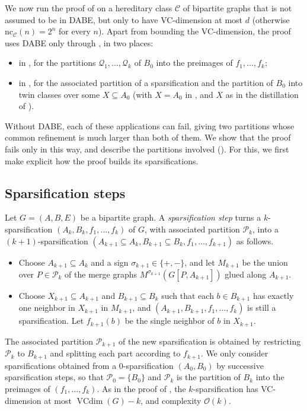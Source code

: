 \documentclass[11pt]{article}
\theoremstyle{definition}
\newcommand{\CC}{{\mathscr C}}
\newcommand{\Oh}{\mathcal{O}}
\newcommand{\nc}{\text{nc}}
\newcommand{\set}[1]{\{#1\}}
\DeclareMathOperator{\VCdim}{VCdim}
\newcommand{\Pp}{\mathcal{P}}
\newcommand{\Qq}{\mathcal{Q}}
\newcommand{\remph}[1]{{\color{red} \emph{#1}}}
\begin{document}
We now run the proof of  on a hereditary class $\CC$ of bipartite graphs that is not assumed to be in DABE, but only to have VC-dimension at most $d$ (otherwise $\nc_\CC(n) = 2^n$ for every $n$).
Apart from bounding the VC-dimension, the proof uses DABE only through , in two places:
\begin{itemize}
  \item in , for the partitions $\Qq_1, \dots, \Qq_k$ of $B_0$ into the preimages of $f_1, \dots, f_k$;
  \item in , for the associated partition of a sparsification and the partition of $B_0$ into twin classes over some $X \subseteq A_0$ (with $X = A_0$ in , and $X$ as in the distillation of ).
\end{itemize}
Without DABE, each of these applications can fail, giving two partitions whose common refinement is much larger than both of them.
We show that the proof fails only in this way, and describe the partitions involved ().
For this, we first make explicit how the proof builds its sparsifications.

\subsection{Sparsification steps}
Let $G = (A, B, E)$ be a bipartite graph.
A \remph{sparsification step} turns a $k$-sparsification $(A_k, B_k, f_1, \dots, f_k)$ of $G$, with associated partition $\Pp_{k}$, into a $(k+1)$-sparsification $(A_{k+1} \subseteq A_k,B_{k+1} \subseteq B_k, f_1, \dots, f_{k+1})$ as follows.
\begin{itemize}
  \item Choose $A_{k+1} \subseteq A_k$ and a sign $\sigma_{k+1} \in \set{+, -}$, and let $M_{k+1}$ be the union over $P \in \Pp_k$ of the merge graphs $M^{\sigma_{k+1}}(G[P, A_{k+1}])$ glued along $A_{k+1}$.
  \item Choose $X_{k+1} \subseteq A_{k+1}$ and $B_{k+1} \subseteq B_k$ such that each $b \in B_{k+1}$ has exactly one neighbor in $X_{k+1}$ in $M_{k+1}$, and $(A_{k+1}, B_{k+1}, f_1, \dots, f_k)$ is still a sparsification. Let $f_{k+1}(b)$ be the single neighbor of $b$ in $X_{k+1}$.
\end{itemize}
The associated partition $\Pp_{k+1}$ of the new sparsification is obtained by restricting $\Pp_k$ to $B_{k+1}$ and splitting each part according to $f_{k+1}$.
We only consider sparsifications obtained from a $0$-sparsification $(A_0, B_0)$ by successive sparsification steps, so that $\Pp_0 = \set{B_0}$ and $\Pp_k$ is the partition of $B_k$ into the preimages of $(f_1, \dots, f_k)$.
As in the proof of , the $k$-sparsification has VC-dimension at most $\VCdim(G) - k$, and complexity $\Oh(k)$.
\end{document}
